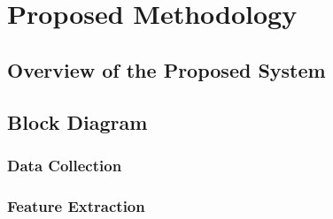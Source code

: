 \chapter{Proposed Methodology}



\section{Overview of the Proposed System}
  \section{Block Diagram}
  
\subsection{Data Collection}
\subsection{Feature Extraction}
